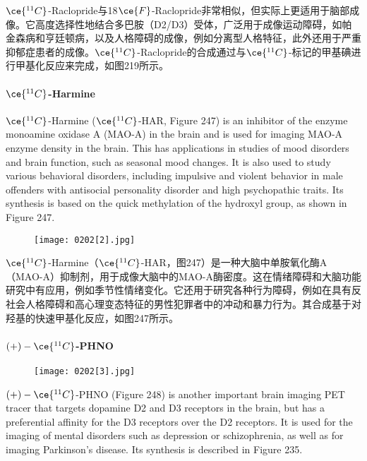 \documentclass[dvipsnames, svgnames,a4paper,11pt]{article}
\begin{document}
\(\ce{^{11}C}\)-Raclopride与18\(\ce{F}\)-Raclopride非常相似，但实际上更适用于脑部成像。它高度选择性地结合多巴胺（D2/D3）受体，广泛用于成像运动障碍，如帕金森病和亨廷顿病，以及人格障碍的成像，例如分离型人格特征，此外还用于严重抑郁症患者的成像。\(\ce{^{11}C}\)-Raclopride的合成通过与\(\ce{^{11}C}\)-标记的甲基碘进行甲基化反应来完成，如图219所示。

\paragraph{\(\ce{^{11}C}\)-Harmine}  
\(\ce{^{11}C}\)-Harmine (\(\ce{^{11}C}\)-HAR, Figure 247) is an inhibitor of the enzyme monoamine oxidase A (MAO-A) in the brain and is used for imaging MAO-A enzyme density in the brain. This has applications in studies of mood disorders and brain function, such as seasonal mood changes. It is also used to study various behavioral disorders, including impulsive and violent behavior in male offenders with antisocial personality disorder and high psychopathic traits. Its synthesis is based on the quick methylation of the hydroxyl group, as shown in Figure 247.

\begin{figure}[h]
	\centering
    \texttt{[image: 0202[2].jpg]}  
     \label{fig247}
\end{figure}


\(\ce{^{11}C}\)-Harmine（\(\ce{^{11}C}\)-HAR，图247）是一种大脑中单胺氧化酶A（MAO-A）抑制剂，用于成像大脑中的MAO-A酶密度。这在情绪障碍和大脑功能研究中有应用，例如季节性情绪变化。它还用于研究各种行为障碍，例如在具有反社会人格障碍和高心理变态特征的男性犯罪者中的冲动和暴力行为。其合成基于对羟基的快速甲基化反应，如图247所示。



\paragraph{\((+)-\ce{^{11}C}\)-PHNO}  


\begin{wrapfigure}{r}{0.4\textwidth}
    \centering
    \texttt{[image: 0202[3].jpg]}
     \label{fig248}
\end{wrapfigure}

\((+)-\ce{^{11}C}\)-PHNO (Figure 248) is another important brain imaging PET tracer that targets dopamine D2 and D3 receptors in the brain, but has a preferential affinity for the D3 receptors over the D2 receptors. It is used for the imaging of mental disorders such as depression or schizophrenia, as well as for imaging Parkinson's disease. Its synthesis is described in Figure 235.
\end{document}

